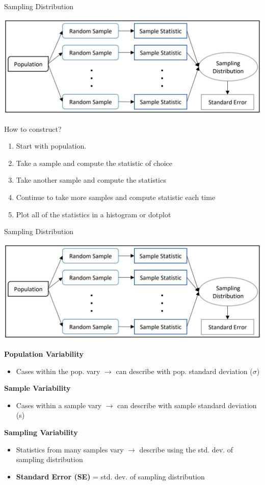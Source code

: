 \documentclass{beamer}
\begin{document}
\begin{frame}{Sampling Distribution}
\begin{center}
    \includegraphics[scale=.6]{img/sampling_distr_method.jpg}
\end{center}
How to construct?
\begin{enumerate}
    \item Start with population.
    \item Take a sample and compute the statistic of choice
    \item Take another sample and compute the statistics
    \item Continue to take more samples and compute statistic each time
    \item Plot all of the statistics in a histogram or dotplot
\end{enumerate}
\end{frame}

\begin{frame}{Sampling Distribution}
\begin{center}
    \includegraphics[scale=.5]{img/sampling_distr_method.jpg}
\end{center}
\scriptsize
\textbf{Population Variability}
\begin{itemize}
    \item Cases within the pop. vary $\rightarrow$ can describe with pop. standard deviation ($\sigma$)
\end{itemize}
\textbf{Sample Variability}
\begin{itemize}
    \item Cases within a sample vary $\rightarrow$ can describe with sample standard deviation (s)
\end{itemize} \vspace{4mm}
\textbf{Sampling Variability}
\begin{itemize}
    \item Statistics from many samples vary $\rightarrow$ describe using the std. dev. of sampling distribution
    \item \textbf{Standard Error (SE)} = std. dev. of sampling distribution
\end{itemize}
\end{frame}
\end{document}
